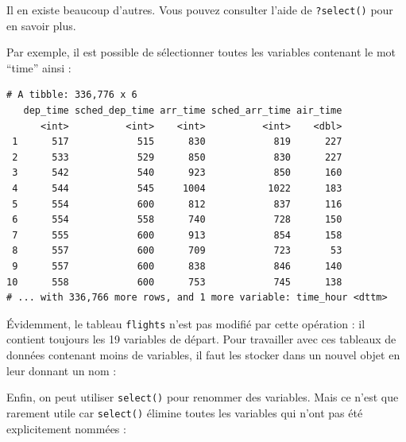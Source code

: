 \documentclass[
  a4paper,
]{article}
\newenvironment{Shaded}{\begin{snugshade}}{\end{snugshade}}
\newcommand{\KeywordTok}[1]{\textcolor[rgb]{0.12,0.11,0.11}{\textbf{#1}}}
\newcommand{\NormalTok}[1]{\textcolor[rgb]{0.12,0.11,0.11}{#1}}
\newcommand{\OperatorTok}[1]{\textcolor[rgb]{0.12,0.11,0.11}{#1}}
\newcommand{\StringTok}[1]{\textcolor[rgb]{0.75,0.01,0.01}{#1}}
\begin{document}
Il en existe beaucoup d'autres. Vous pouvez consulter l'aide de \texttt{?select()} pour en savoir plus.

Par exemple, il est possible de sélectionner toutes les variables contenant le mot ``time'' ainsi :

\begin{Shaded}
\end{Shaded}

\begin{verbatim}
# A tibble: 336,776 x 6
   dep_time sched_dep_time arr_time sched_arr_time air_time
      <int>          <int>    <int>          <int>    <dbl>
 1      517            515      830            819      227
 2      533            529      850            830      227
 3      542            540      923            850      160
 4      544            545     1004           1022      183
 5      554            600      812            837      116
 6      554            558      740            728      150
 7      555            600      913            854      158
 8      557            600      709            723       53
 9      557            600      838            846      140
10      558            600      753            745      138
# ... with 336,766 more rows, and 1 more variable: time_hour <dttm>
\end{verbatim}

Évidemment, le tableau \texttt{flights} n'est pas modifié par cette opération : il contient toujours les 19 variables de départ. Pour travailler avec ces tableaux de données contenant moins de variables, il faut les stocker dans un nouvel objet en leur donnant un nom :

\begin{Shaded}
\end{Shaded}

Enfin, on peut utiliser \texttt{select()} pour renommer des variables. Mais ce n'est que rarement utile car \texttt{select()} élimine toutes les variables qui n'ont pas été explicitement nommées :
\end{document}

